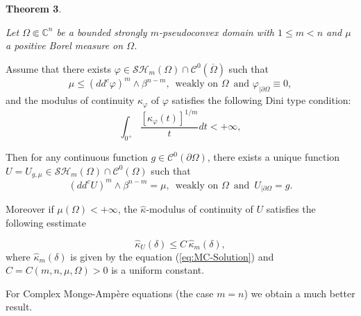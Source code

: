 \documentclass[12pt]{amsart}
\theoremstyle{definition}
\numberwithin{theorem}{section}
\numberwithin{equation}{section}
\newcommand{\C}{\mathbb{C}}
\begin{document}
 \smallskip
  {\bf Theorem 3}.{ \it Let $\Omega \Subset \C^n$ be a  bounded strongly $m$-pseudoconvex  domain  with $1 \leq  m < n$ and $\mu $ a positive Borel measure on $\Omega$. 
  
  Assume that there exists $\varphi\in \mathcal{SH}_m(\Omega)\cap\mathcal{C}^{0}(\overline\Omega)$ such that  
\begin{equation} \label{eq:subsol2}
 \mu \leq (dd^c\varphi)^m\wedge\beta^{n-m}, \, \, \, \mathrm{weakly \, \,  on} \, \,  \Omega \, \, \, \mathrm{and} \, \, \varphi_{\mid  \partial \Omega} \equiv 0,
\end{equation} 
 and the modulus of continuity $\kappa_\varphi$ of $\varphi$ satisfies the following Dini type condition:
 \begin{equation} \label{eq:DC1}
 \int_{0^+} \frac{\left[\kappa_\varphi (t)\right]^{1 \slash m}}{t}  d t< + \infty, 
 \end{equation}


 Then for any continuous function $g \in \mathcal{C}^{0} (\partial \Omega)$, there exists a unique function $U = U_{g,\mu} \in \mathcal{SH}_m (\Omega) \cap \mathcal{C}^0 ({\Omega})$ such that  
 $$
 (dd^c U)^m\wedge\beta^{n-m} = \mu, \, \, \, \mathrm{weakly \, \,  on} \, \,  \Omega \, \, \, \mathrm{and} \, \, \, U_{\mid  \partial \Omega}  = g.
 $$


Moreover if $\mu (\Omega) < + \infty$, the $\widehat{\kappa}$-modulus of continuity of $U$ satisfies the following esstimate
 
$$
\widehat{\kappa}_U (\delta) \leq C  \, \widehat{\kappa}_m (\delta),
$$ 
 where  $\widehat{\kappa}_m (\delta)$ is given by the equation (\ref{eq:MC-Solution}) and $C = C(m,n, \mu, \Omega) > 0$ is a uniform constant.} 
 
  \smallskip
 \smallskip
 
 For Complex Monge-Amp\`ere equations (the case $m = n$) we obtain a much better result.
   
 \smallskip
 \smallskip
 
\end{document}

